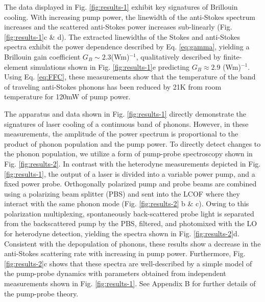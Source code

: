 The data displayed in Fig. \ref{fig:results-1} exhibit key signatures of Brillouin cooling. With increasing pump power, the linewidth of the anti-Stokes spectrum increases and the scattered anti-Stokes power increases sub-linearly (Fig. \ref{fig:results-1}c \& d). The extracted linewidths of the Stokes and anti-Stokes spectra exhibit the power dependence described by Eq. \eqref{eq:gamma}, yielding a Brillouin gain coefficient $G_B \sim 2.3$(Wm)$^{-1}$, qualitatively described by finite-element simulations shown in Fig. \ref{fig:results-1}e predicting $G_B \approx 2.9$ (Wm)$^{-1}$. %
Using Eq. \eqref{eq:FFC}, these measurements show that the temperature of the band of traveling anti-Stokes phonons has been reduced by 21K from room temperature for 120mW of pump power.

The apparatus and data shown in Fig. \ref{fig:results-1} directly demonstrate the signatures of laser cooling of a continuous band of phonons. However, in these measurements, the amplitude of the power spectrum is proportional to the product of phonon population and the pump power. To directly detect changes to the phonon population, we utilize a form of pump-probe spectroscopy shown in Fig. \ref{fig:results-2}. In contrast with the heterodyne measurements depicted in Fig. \ref{fig:results-1}, the output of a laser is divided into a variable power pump, and a fixed power probe. Orthogonally polarized pump and probe beams are combined using a polarizing beam splitter (PBS) and sent into the LCOF where they interact with the same phonon mode (Fig. \ref{fig:results-2} b \& c). Owing to this polarization multiplexing, spontaneously back-scattered probe light is separated from the backscattered pump by the PBS, filtered, and photomixed with the LO for heterodyne detection, yielding the spectra shown in Fig. \ref{fig:results-2}d. Consistent with the depopulation of phonons, these results show a decrease in the anti-Stokes scattering rate with increasing in pump power. Furthermore, Fig. \ref{fig:results-2}c shows that these spectra are well-described by a simple model of the pump-probe dynamics with parameters obtained from independent measurements shown in Fig. \ref{fig:results-1}. See Appendix B for further details of the pump-probe theory.

